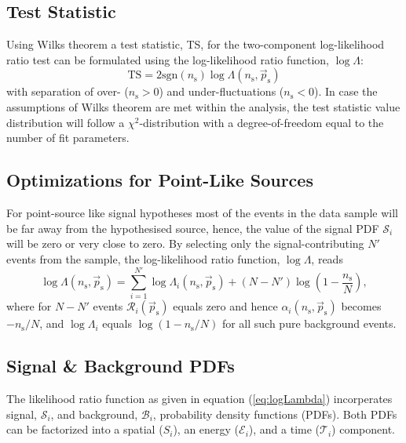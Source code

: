 \documentclass{article}
\newcommand{\eq}[1]{(\ref{#1})}
\newcommand{\ns}{n_{\mathrm{s}}}
\newcommand{\ps}{\vec{p}_{\mathrm{s}}}
\begin{document}
\subsection{Test Statistic}

Using Wilks theorem a test statistic, TS, for the two-component log-likelihood
ratio test can be formulated using the log-likelihood ratio function, $\log\Lambda$:
\begin{equation}
 \mathrm{TS} = 2\mathrm{sgn}(\ns) \log \Lambda(\ns,\ps)
 \label{eq:TS}
\end{equation}
with separation of over- ($\ns > 0$) and under-fluctuations ($\ns < 0$).
In case the assumptions of Wilks theorem are met within the analysis, the test
statistic value distribution will follow a $\chi^2$-distribution with
a degree-of-freedom equal to the number of fit parameters.

\subsection{Optimizations for Point-Like Sources}

For point-source like signal hypotheses most of the events in the data sample
will be far away from the hypothesised source, hence, the value of the
signal PDF $\mathcal{S}_i$ will be zero or very close to zero. By selecting only
the signal-contributing $N'$ events from the sample, the log-likelihood ratio
function, $\log \Lambda$, reads
\begin{equation}
 \log \Lambda(\ns,\ps) = \sum_{i=1}^{N'} \log \Lambda_i(\ns,\ps) + (N - N')\log(1 - \frac{\ns}{N}),
 \label{eq:logLambdaOfXOptimized}
\end{equation}
where for $N-N'$ events $\mathcal{R}_i(\ps)$ equals zero and hence
$\alpha_i(\ns,\ps)$ becomes $-\ns/N$, and $\log \Lambda_i$ equals $\log(1 - \ns/N)$
for all such pure background events.

\subsection{Signal \& Background PDFs}

The likelihood ratio function as given in equation \eq{eq:logLambda}
incorperates signal, $\mathcal{S}_i$, and background, $\mathcal{B}_i$,
probability density functions (PDFs). Both PDFs can be factorized into a
spatial ($S_i$), an energy ($\mathcal{E}_i$), and a time ($\mathcal{T}_i$)
component.
\end{document}
